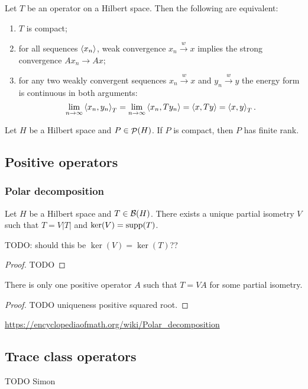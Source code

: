 \begin{proposition}
Let $T$ be an operator on a Hilbert space. Then the following are equivalent:
\begin{enumerate}
\item $T$ is compact;
\item for all sequences $\left\langle x_n \right\rangle$, weak convergence $x_n \overset{w}{\to} x$ implies the strong convergence $Ax_n \to Ax$;
\item for any two weakly convergent sequences $x_n\overset{w}{\to} x$ and $y_n\overset{w}{\to} y$ the energy form is continuous in both arguments:
\[ \lim_{n\to\infty}\left\langle x_n,y_n \right\rangle_T = \lim_{n\to\infty}\left\langle x_n,Ty_n \right\rangle = \left\langle x,Ty \right\rangle = \left\langle x,y \right\rangle_T. \]
\end{enumerate} 
\end{proposition}

\begin{lemma}
Let $H$ be a Hilbert space and $P\in\mathop{\mathcal{P}}\nolimits(H)$. If $P$ is compact, then $P$ has finite rank.
\end{lemma}

\subsection{Positive operators}

\subsubsection{Polar decomposition}
\begin{proposition}
Let $H$ be a Hilbert space and $T\in \operatorname{\mathcal{B}}(H)$. There exists a unique partial isometry $V$ such that $T = V|T|$ and $\ker(V) = \operatorname{supp}(T)$.
\end{proposition}
TODO: should this be $\ker(V) = \ker(T)$??
\begin{proof}
TODO
\end{proof}
\begin{lemma}
There is only one positive operator $A$ such that $T = VA$ for some partial isometry.
\end{lemma}
\begin{proof}
TODO uniqueness positive squared root.
\end{proof}

\url{https://encyclopediaofmath.org/wiki/Polar_decomposition}

\subsection{Trace class operators}
TODO Simon


